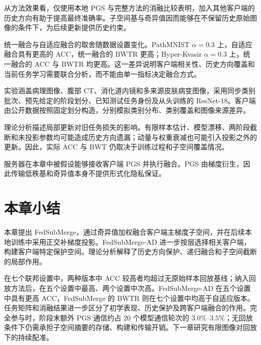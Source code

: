 从方法效果看，仅使用本地 PGS 与完整方法的消融比较表明，加入其他客户端的历史方向有助于提高最终准确率。子空间基与奇异值因而能够在不保留历史原始图像的条件下，为后续更新提供历史约束。

统一融合与自适应融合的取舍随数据设置变化。PathMNIST $\alpha=0.3$ 上，自适应融合具有更高的 ACC，统一融合的 BWTR 更高；Hyper-Kvasir $\alpha=0.3$ 上，统一融合的 ACC 与 BWTR 均更高。这一差异说明客户端相关性、历史方向覆盖和当前任务学习需要联合分析，而不能由单一指标决定融合方式。

实验涵盖病理图像、腹部 CT、消化道内镜和多来源皮肤病变图像，采用同步类别批次、预先给定的阶段划分、已知测试任务身份及从头训练的 ResNet-18。客户端由公开数据按照固定划分构造，分别模拟类别分布、类别覆盖和图像来源差异。

理论分析描述局部更新对旧任务损失的影响。有限样本估计、模型漂移、两阶段截断和未投影参数均可能造成历史方向遗漏；动量与权重衰减也可能引入投影之外的更新。因此，实际 ACC 与 BWT 仍取决于训练过程和子空间覆盖情况。

服务器在本章中被假设能够接收客户端 PGS 并执行融合。PGS 由梯度衍生，因此传输低秩基和奇异值本身不提供形式化隐私保证。

\section{本章小结}
\label{sec:fedsubmerge-summary}

本章提出 FedSubMerge，通过奇异值加权融合客户端主梯度子空间，并在后续本地训练中采用正交补梯度投影。FedSubMerge-AD 进一步按层选择相关客户端，构建客户端特定保护空间。理论分析解释了历史方向保护、递归融合和子空间截断的局部作用。

在七个联邦设置中，两种版本中 ACC 较高者均超过无原始样本回放基线；纳入回放方法后，在五个设置中最高、两个设置中次高。FedSubMerge-AD 在五个设置中具有更高 ACC，FedSubMerge 的 BWTR 则在七个设置中均高于自适应版本。任务矩阵和消融结果进一步区分了初学表现、历史保护及跨客户端融合的作用。完全参与时，阶段末额外 PGS 通信约占 20 个模型通信轮次的 $3.0\%$--$3.5\%$；无回放条件下仍需承担子空间摘要的存储、构建和传输开销。下一章研究有限图像对回放下的持续配准。